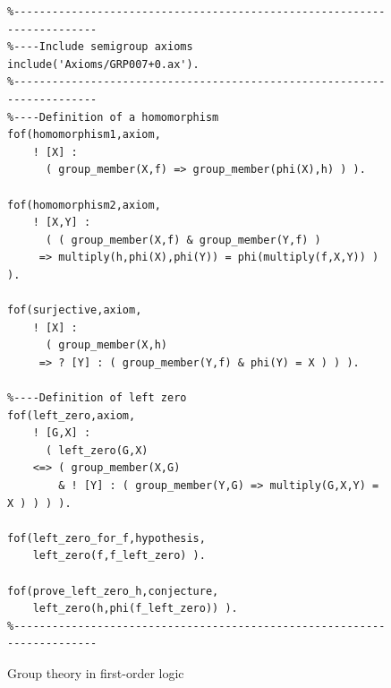 \documentclass[runningheads]{llncs}
\begin{document}
\begin{figure}[htb]
\centering
{\footnotesize
{\setlength{\baselineskip}{3mm}
\begin{verbatim}
%------------------------------------------------------------------------
%----Include semigroup axioms
include('Axioms/GRP007+0.ax').
%------------------------------------------------------------------------
%----Definition of a homomorphism
fof(homomorphism1,axiom,
    ! [X] :
      ( group_member(X,f) => group_member(phi(X),h) ) ).

fof(homomorphism2,axiom,
    ! [X,Y] :
      ( ( group_member(X,f) & group_member(Y,f) )
     => multiply(h,phi(X),phi(Y)) = phi(multiply(f,X,Y)) ) ).

fof(surjective,axiom,
    ! [X] :
      ( group_member(X,h)
     => ? [Y] : ( group_member(Y,f) & phi(Y) = X ) ) ).

%----Definition of left zero
fof(left_zero,axiom,
    ! [G,X] :
      ( left_zero(G,X)
    <=> ( group_member(X,G)
        & ! [Y] : ( group_member(Y,G) => multiply(G,X,Y) = X ) ) ) ).

fof(left_zero_for_f,hypothesis,
    left_zero(f,f_left_zero) ).

fof(prove_left_zero_h,conjecture,
    left_zero(h,phi(f_left_zero)) ).
%------------------------------------------------------------------------
\end{verbatim}
}}
\caption{Group theory in first-order logic}
\label{ExampleFOF}
\end{figure}
\end{document}
